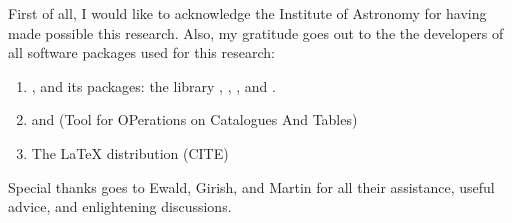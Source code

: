 
\begin{acknowledgements}      
    
    First of all, I would like to acknowledge the Institute of Astronomy for having made possible this research. Also, my gratitude goes out to the the developers of all software packages used for this research:
    \begin{enumerate}[label=--]
        \item {}, and its packages: the  library \citep{Jones2001},  \citep{2011CSE....13b..22V},  \citep{Hunter2007}, and  \citep{2013A&A...558A..33A, 2018AJ....156..123A}.
        \item {} and  (Tool for OPerations on Catalogues And Tables)
        \item The LaTeX distribution (CITE) %
    \end{enumerate}
    
    \par Special thanks goes to Ewald, Girish, and Martin for all their assistance, useful advice, and enlightening discussions.
    
\end{acknowledgements}

